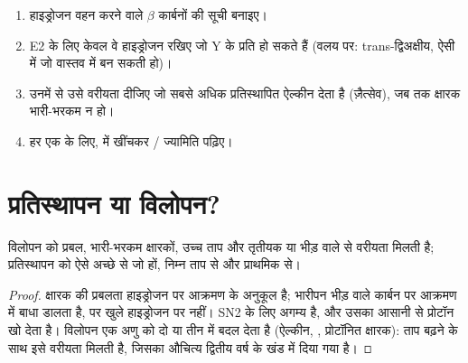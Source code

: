 \begin{method}[ऐल्कीन का पूर्वानुमान]\label{met:b1:elimination:predict-alkene}
\begin{enumerate}
  \item हाइड्रोजन वहन करने वाले $\beta$ कार्बनों की सूची बनाइए।
  \item E2 के लिए केवल वे हाइड्रोजन रखिए जो Y के प्रति  हो सकते हैं (वलय
        पर: trans-द्विअक्षीय, ऐसी  में जो वास्तव में बन सकती हो)।
  \item उनमें से उसे वरीयता दीजिए जो सबसे अधिक प्रतिस्थापित ऐल्कीन देता है
        (ज़ैत्सेव), जब तक क्षारक भारी-भरकम न हो।
  \item हर एक के लिए,  में  खींचकर
        / ज्यामिति पढ़िए।
\end{enumerate}
\end{method}

\section{प्रतिस्थापन या विलोपन?}

\begin{proposition}[प्रतिस्थापन बनाम विलोपन]\label{prop:b1:elimination:sn-vs-e}
विलोपन को प्रबल, भारी-भरकम क्षारकों, उच्च ताप और
तृतीयक या भीड़ वाले  से वरीयता मिलती है; प्रतिस्थापन को ऐसे अच्छे  से जो
 हों, निम्न ताप से और प्राथमिक  से।
\end{proposition}

\begin{proof}
क्षारक की प्रबलता हाइड्रोजन पर आक्रमण के अनुकूल है; भारीपन
भीड़ वाले कार्बन पर आक्रमण में बाधा डालता है, पर खुले हाइड्रोजन पर नहीं। 
SN2 के लिए अगम्य है, और उसका  आसानी से प्रोटॉन खो देता है। विलोपन
एक अणु को दो या तीन में बदल देता है (ऐल्कीन, , प्रोटॉनित
क्षारक): ताप बढ़ने के साथ इसे वरीयता मिलती है, जिसका औचित्य
द्वितीय वर्ष के खंड में दिया गया है।
\end{proof}

